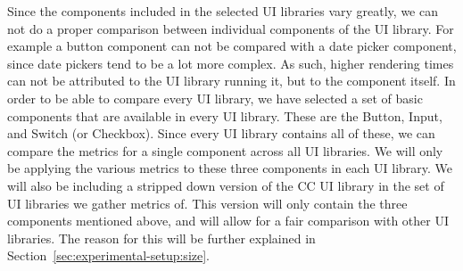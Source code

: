 Since the components included in the selected UI libraries vary greatly, we can not do a proper comparison between individual components of the UI library. For example a button component can not be compared with a date picker component, since date pickers tend to be a lot more complex. As such, higher rendering times can not be attributed to the UI library running it, but to the component itself. In order to be able to compare every UI library, we have selected a set of basic components that are available in every UI library. These are the Button, Input, and Switch (or Checkbox). Since every UI library contains all of these, we can compare the metrics for a single component across all UI libraries. We will only be applying the various metrics to these three components in each UI library. We will also be including a stripped down version of the CC UI library in the set of UI libraries we gather metrics of. This version will only contain the three components mentioned above, and will allow for a fair comparison with other UI libraries. The reason for this will be further explained in Section~\ref{sec:experimental-setup:size}.

